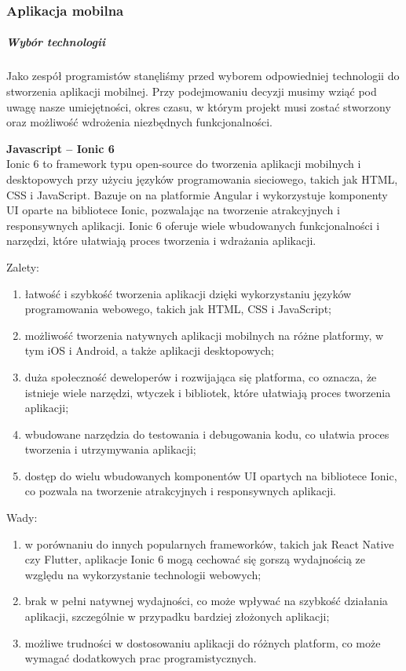 \documentclass[12pt, a4paper, twoside, openany]{book}
\begin{document}
\subsubsection{Aplikacja mobilna}

\subparagraph{Wybór technologii}
Jako zespół programistów stanęliśmy przed wyborem odpowiedniej technologii do stworzenia aplikacji mobilnej. Przy podejmowaniu decyzji musimy wziąć pod uwagę nasze umiejętności, okres czasu, w którym projekt musi zostać stworzony oraz możliwość wdrożenia niezbędnych funkcjonalności.

\textbf{Javascript -- Ionic 6\\}
Ionic 6 to framework typu open-source do tworzenia aplikacji mobilnych i desktopowych przy użyciu języków programowania sieciowego, takich jak HTML, CSS i JavaScript. Bazuje on na platformie Angular i wykorzystuje komponenty UI oparte na bibliotece Ionic, pozwalając na tworzenie atrakcyjnych i responsywnych aplikacji. Ionic 6 oferuje wiele wbudowanych funkcjonalności i narzędzi, które ułatwiają proces tworzenia i wdrażania aplikacji.

Zalety:
\begin{enumerate}[label=--]
    \item łatwość i szybkość tworzenia aplikacji dzięki wykorzystaniu języków programowania webowego, takich jak HTML, CSS i JavaScript;
    \item możliwość tworzenia natywnych aplikacji mobilnych na różne platformy, w tym iOS i Android, a także aplikacji desktopowych;
    \item duża społeczność deweloperów i rozwijająca się platforma, co oznacza, że istnieje wiele narzędzi, wtyczek i bibliotek, które ułatwiają proces tworzenia aplikacji;
    \item wbudowane narzędzia do testowania i debugowania kodu, co ułatwia proces tworzenia i utrzymywania aplikacji;
    \item dostęp do wielu wbudowanych komponentów UI opartych na bibliotece Ionic, co pozwala na tworzenie atrakcyjnych i responsywnych aplikacji.
\end{enumerate}

Wady:
\begin{enumerate}[label=--]
    \item w porównaniu do innych popularnych frameworków, takich jak React Native czy Flutter, aplikacje Ionic 6 mogą cechować się gorszą wydajnością ze względu na wykorzystanie technologii webowych;
    \item brak w pełni natywnej wydajności, co może wpływać na szybkość działania aplikacji, szczególnie w przypadku bardziej złożonych aplikacji;
    \item możliwe trudności w dostosowaniu aplikacji do różnych platform, co może wymagać dodatkowych prac programistycznych.
\end{enumerate}
\end{document}
